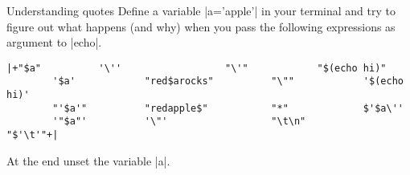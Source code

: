 
\begin{exercise}[Instructive]{Understanding quotes}
    Define a variable \bash|a='apple'| in your terminal and try to figure out what happens (and why) when you pass the following expressions as argument to \bash|echo|.
    \begin{lstlisting}[style=MyBash, moredelim={[is][\color{strings-color}]{|+}{+|}}]
        |+"$a"          '\''                  "\'"            "$(echo hi)"
        '$a'            "red$arocks"          "\""            '$(echo hi)'
        "'$a'"          "redapple$"           "*"             $'$a\''
        '"$a"'          '\"'                  "\t\n"          "$'\t'"+|
    \end{lstlisting}
    At the end unset the variable \bash|a|.
\end{exercise}
